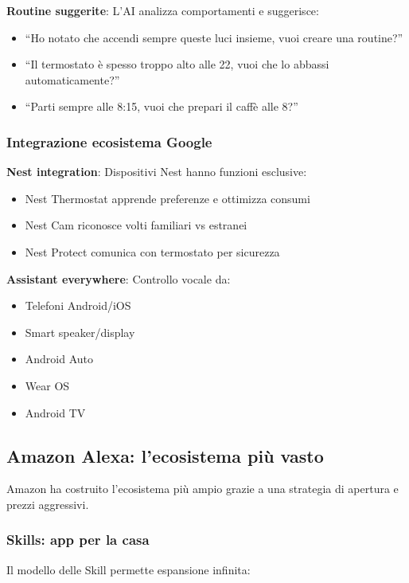 \textbf{Routine suggerite}: L'AI analizza comportamenti e suggerisce:
\begin{itemize}
    \item ``Ho notato che accendi sempre queste luci insieme, vuoi creare una routine?''
    \item ``Il termostato è spesso troppo alto alle 22, vuoi che lo abbassi automaticamente?''
    \item ``Parti sempre alle 8:15, vuoi che prepari il caffè alle 8?''
\end{itemize}

\subsubsection{Integrazione ecosistema Google}

\textbf{Nest integration}: Dispositivi Nest hanno funzioni esclusive:
\begin{itemize}
    \item Nest Thermostat apprende preferenze e ottimizza consumi
    \item Nest Cam riconosce volti familiari vs estranei
    \item Nest Protect comunica con termostato per sicurezza
\end{itemize}

\textbf{Assistant everywhere}: Controllo vocale da:
\begin{itemize}
    \item Telefoni Android/iOS
    \item Smart speaker/display
    \item Android Auto
    \item Wear OS
    \item Android TV
\end{itemize}

\subsection{Amazon Alexa: l'ecosistema più vasto}

Amazon ha costruito l'ecosistema più ampio grazie a una strategia di apertura e prezzi aggressivi.

\subsubsection{Skills: app per la casa}

Il modello delle Skill permette espansione infinita:

